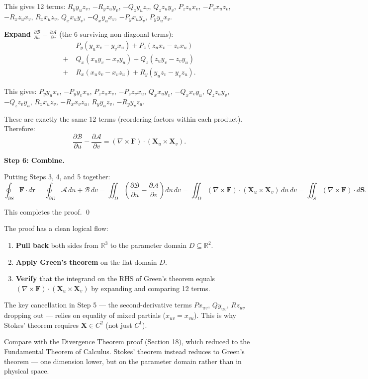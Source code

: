 \documentclass[11pt]{report}
\newcommand{\R}{\mathbb{R}}
\newcommand{\parti}[2]{\frac{\partial #1}{\partial #2}}
\begin{document}
This gives 12 terms: $R_y y_u z_v$, $-R_y z_u y_v$, $-Q_z y_u z_v$, $Q_z z_u y_v$, $P_z z_u x_v$, $-P_z x_u z_v$, $-R_x z_u x_v$, $R_x x_u z_v$, $Q_x x_u y_v$, $-Q_x y_u x_v$, $-P_y x_u y_v$, $P_y y_u x_v$.

\textbf{Expand $\parti{\mathcal{B}}{u} - \parti{\mathcal{A}}{v}$} (the 6 surviving non-diagonal terms):
\begin{align*}
&P_y(y_u x_v - y_v x_u) + P_z(z_u x_v - z_v x_u) \\
+\; &Q_x(x_u y_v - x_v y_u) + Q_z(z_u y_v - z_v y_u) \\
+\; &R_x(x_u z_v - x_v z_u) + R_y(y_u z_v - y_v z_u).
\end{align*}

This gives: $P_y y_u x_v$, $-P_y y_v x_u$, $P_z z_u x_v$, $-P_z z_v x_u$, $Q_x x_u y_v$, $-Q_x x_v y_u$, $Q_z z_u y_v$, $-Q_z z_v y_u$, $R_x x_u z_v$, $-R_x x_v z_u$, $R_y y_u z_v$, $-R_y y_v z_u$.

These are exactly the same 12 terms (reordering factors within each product). Therefore:
\[
\parti{\mathcal{B}}{u} - \parti{\mathcal{A}}{v} = (\nabla \times \mathbf{F}) \cdot (\mathbf{X}_u \times \mathbf{X}_v).
\]

\textbf{Step 6: Combine.}

Putting Steps 3, 4, and 5 together:
\[
\oint_{\partial S} \mathbf{F} \cdot d\mathbf{r} = \oint_{\partial D} \mathcal{A} \, du + \mathcal{B} \, dv = \iint_D \left(\parti{\mathcal{B}}{u} - \parti{\mathcal{A}}{v}\right) du \, dv = \iint_D (\nabla \times \mathbf{F}) \cdot (\mathbf{X}_u \times \mathbf{X}_v) \, du \, dv = \iint_S (\nabla \times \mathbf{F}) \cdot d\mathbf{S}.
\]

This completes the proof. \qed

\begin{remark}
The proof has a clean logical flow:
\begin{enumerate}
    \item \textbf{Pull back} both sides from $\R^3$ to the parameter domain $D \subseteq \R^2$.
    \item \textbf{Apply Green's theorem} on the flat domain $D$.
    \item \textbf{Verify} that the integrand on the RHS of Green's theorem equals $(\nabla \times \mathbf{F}) \cdot (\mathbf{X}_u \times \mathbf{X}_v)$ by expanding and comparing 12 terms.
\end{enumerate}

The key cancellation in Step 5 --- the second-derivative terms $Px_{uv}$, $Qy_{uv}$, $Rz_{uv}$ dropping out --- relies on equality of mixed partials ($x_{uv} = x_{vu}$). This is why Stokes' theorem requires $\mathbf{X} \in C^2$ (not just $C^1$).

Compare with the Divergence Theorem proof (Section 18), which reduced to the Fundamental Theorem of Calculus. Stokes' theorem instead reduces to Green's theorem --- one dimension lower, but on the parameter domain rather than in physical space.
\end{remark}
\end{document}
